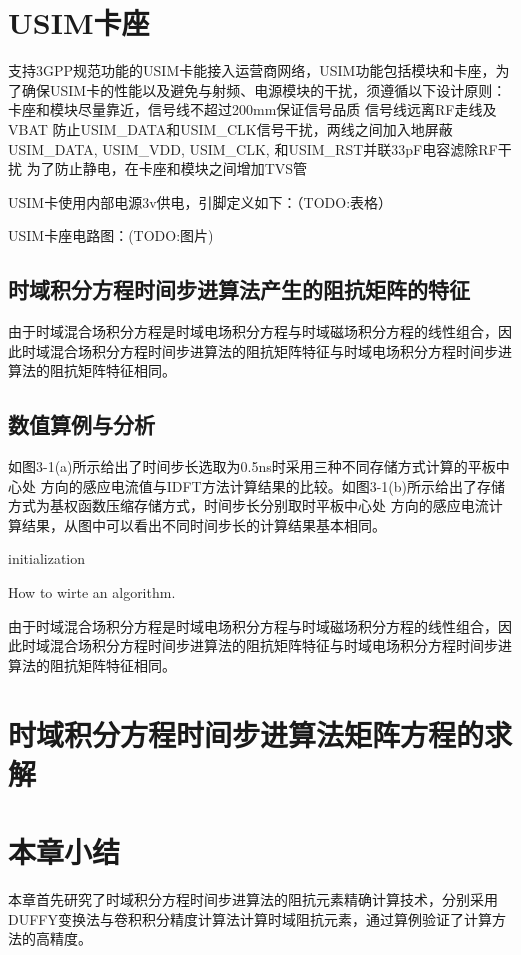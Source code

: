 \section{USIM卡座}
支持3GPP规范功能的USIM卡能接入运营商网络，USIM功能包括模块和卡座，为了确保USIM卡的性能以及避免与射频、电源模块的干扰，须遵循以下设计原则：
卡座和模块尽量靠近，信号线不超过200mm保证信号品质
信号线远离RF走线及VBAT
防止USIM\_DATA和USIM\_CLK信号干扰，两线之间加入地屏蔽
USIM\_DATA, USIM\_VDD, USIM\_CLK, 和USIM\_RST并联33pF电容滤除RF干扰
为了防止静电，在卡座和模块之间增加TVS管

USIM卡使用内部电源3v供电，引脚定义如下：（TODO:表格）

USIM卡座电路图：(TODO:图片)

\subsection{时域积分方程时间步进算法产生的阻抗矩阵的特征}
由于时域混合场积分方程是时域电场积分方程与时域磁场积分方程的线性组合，因此时域混合场积分方程时间步进算法的阻抗矩阵特征与时域电场积分方程时间步进算法的阻抗矩阵特征相同。

\subsection{数值算例与分析}

如图3-1(a)所示给出了时间步长选取为0.5ns时采用三种不同存储方式计算的平板中心处 方向的感应电流值与IDFT方法计算结果的比较。如图3-1(b)所示给出了存储方式为基权函数压缩存储方式，时间步长分别取时平板中心处 方向的感应电流计算结果，从图中可以看出不同时间步长的计算结果基本相同。

\begin{algorithm}[H]
 initialization\;
 \caption{How to wirte an algorithm.}
\end{algorithm}

由于时域混合场积分方程是时域电场积分方程与时域磁场积分方程的线性组合，因此时域混合场积分方程时间步进算法的阻抗矩阵特征与时域电场积分方程时间步进算法的阻抗矩阵特征相同。

\section{时域积分方程时间步进算法矩阵方程的求解}

\section{本章小结}
本章首先研究了时域积分方程时间步进算法的阻抗元素精确计算技术，分别采用DUFFY变换法与卷积积分精度计算法计算时域阻抗元素，通过算例验证了计算方法的高精度。